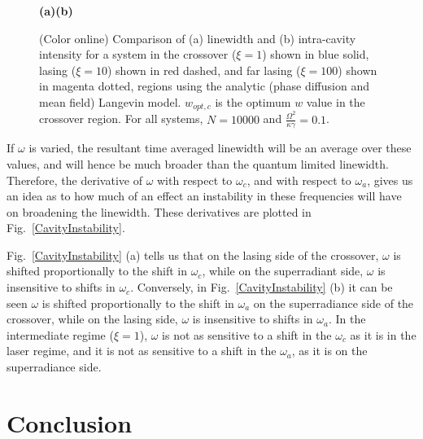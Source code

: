 \documentclass[aps,
twocolumn,
showpacs,
superscriptaddress,groupedaddress]{revtex4}
\begin{document}
\begin{figure}
\begin{center}
	\hspace{6mm}\textbf{(a)}\hspace{37mm}\textbf{(b)} \hspace{35mm}
\end{center}
		\vspace{-5mm}
\caption{(Color online) Comparison of (a) linewidth and (b) intra-cavity
intensity for a system in the crossover ($\xi=1$) shown in blue solid,
lasing ($\xi=10$) shown in red dashed, and far lasing ($\xi=100$) shown
in magenta dotted, regions using the analytic (phase diffusion and mean
field) Langevin model. $w_{opt,c}$ is the optimum $w$ value in the
crossover region. For all systems, $N=10000$ and $\frac{\Omega^2}{\kappa
\gamma}=0.1$.}
\label{LWadaComparison}
\end{figure}

If $\omega$ is varied, the resultant time averaged linewidth will be an
average over these values, and will hence be much broader than the
quantum limited linewidth. Therefore, the derivative of  $\omega$ with
respect to $\omega_c$, and with respect to $\omega_a$, gives us an idea
as to how much of an effect an instability in these frequencies will
have on broadening the linewidth. These derivatives are plotted in
Fig.~\ref{CavityInstability}.

Fig.~\ref{CavityInstability} (a) tells us that on the lasing side of the
crossover, $\omega$ is shifted proportionally to the shift in
$\omega_c$, while on the superradiant side, $\omega$ is insensitive to
shifts in $\omega_c$.  Conversely, in Fig.~\ref{CavityInstability} (b)
it can be seen $\omega$ is shifted proportionally to the shift in
$\omega_a$ on the superradiance side of the crossover, while on the
lasing side, $\omega$ is insensitive to shifts in $\omega_a$. In the
intermediate regime ($\xi=1$), $\omega$ is not as sensitive to a shift
in the $\omega_c$ as it is in the laser regime, and it is not as
sensitive to a shift in the $\omega_a$, as it is on the superradiance
side.

\section{Conclusion}
\end{document}
